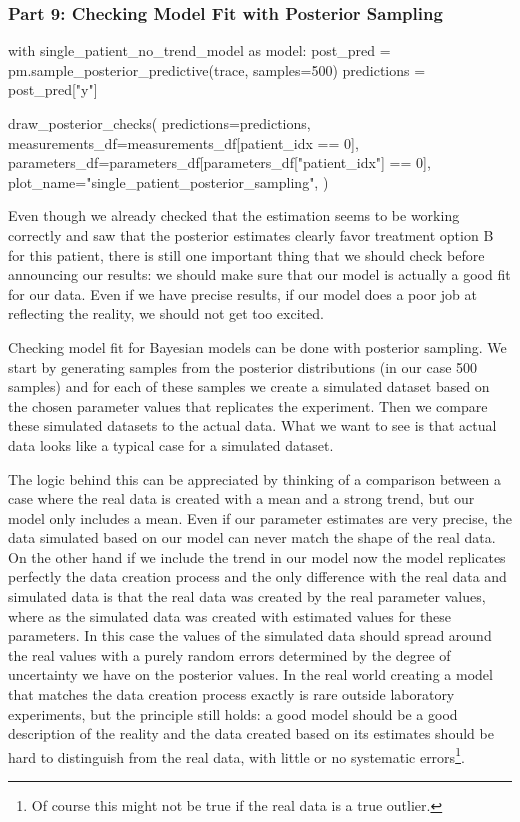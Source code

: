 \documentclass[12pt,a4paper,leqno]{report}
\theoremstyle{plain}
\theoremstyle{definition}
\theoremstyle{remark}
\begin{document}
\subsubsection*{Part 9: Checking Model Fit with Posterior Sampling}

\bigskip
\begin{pyverbatim}[][fontsize=\footnotesize]
    with single_patient_no_trend_model as model:
        post_pred = pm.sample_posterior_predictive(trace, samples=500)
        predictions = post_pred["y"]

    draw_posterior_checks(
        predictions=predictions,
        measurements_df=measurements_df[patient_idx == 0],
        parameters_df=parameters_df[parameters_df["patient_idx"] == 0],
        plot_name="single_patient_posterior_sampling",
    )
\end{pyverbatim}
\smallskip

Even though we already checked that the estimation seems to be working correctly and saw
that the posterior estimates clearly favor treatment option B for this patient, there is
still one important thing that we should check before announcing our results: we should
make sure that our model is actually a good fit for our data. Even if we have precise
results, if our model does a poor job at reflecting the reality, we should not get too excited.

Checking model fit for Bayesian models can be done with posterior sampling. We start by generating samples from
the posterior distributions (in our case 500 samples) and for each of these samples we create a simulated dataset based
on the chosen parameter values that replicates the experiment. Then we compare these
simulated datasets to the actual data. What we want to see is that actual data looks
like a typical case for a simulated dataset.

The logic behind this can be appreciated by thinking of a comparison between a case
where the real data is created with a mean and a strong trend, but our model only includes a
mean. Even if our parameter estimates are very precise, the data simulated based on our
model can never match the shape of the real data. On the other hand if we include the trend in our
model now the model replicates perfectly the data creation process and
the only difference with the real data and simulated data is that the real data was
created by the real parameter values, where as the simulated data was created with
estimated values for these parameters. In this case the values of the simulated data
should spread around the real values with a purely random errors determined by the degree
of uncertainty we have on the posterior values. In the real world creating a model that
matches the data creation process exactly is rare outside laboratory experiments, but
the principle still holds: a good model should be a good description of the reality and
the data created based on its estimates should be hard to distinguish from the real
data, with little or no systematic errors\footnote{Of course this might not be true if the
real data is a true outlier.}.
\end{document}
